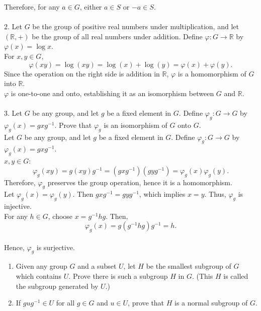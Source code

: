 Therefore, for any \( a \in G \), either \( a \in S \) or \( -a \in S \).
\\
\\
2. Let \( G \) be the group of positive real numbers under multiplication, and let \( (\mathbb{R}, +) \) be the group of all real numbers under addition. Define \( \varphi : G \to \mathbb{R} \) by \( \varphi(x) = \log x \).
\\
For \( x, y \in G \),
    \[
    \varphi(xy) = \log(xy) = \log(x) + \log(y) = \varphi(x) + \varphi(y).
    \]
    Since the operation on the right side is addition in \( \mathbb{R} \), \( \varphi \) is a homomorphism of \( G \) into \( \mathbb{R} \).
\\
\( \varphi \) is one-to-one and onto, establishing it as an isomorphism between \( G \) and \( \mathbb{R} \).
\\
\\
3. Let \( G \) be any group, and let \( g \) be a fixed element in \( G \). Define \( \varphi_g : G \to G \) by \( \varphi_g(x) = gxg^{-1} \). Prove that \( \varphi_g \) is an isomorphism of \( G \) onto \( G \).
\\
Let \( G \) be any group, and let \( g \) be a fixed element in \( G \). Define \( \varphi_g : G \to G \) by \( \varphi_g(x) = gxg^{-1} \).
\\
\( x, y \in G \):
    \[
    \varphi_g(xy) = g(xy)g^{-1} = (gxg^{-1})(gyg^{-1}) = \varphi_g(x) \varphi_g(y).
    \]
    Therefore, \( \varphi_g \) preserves the group operation, hence it is a homomorphism.
    \\
    Let \( \varphi_g(x) = \varphi_g(y) \). Then \( gxg^{-1} = gyg^{-1} \), which implies \( x = y \). Thus, \( \varphi_g \) is injective.
    \\
    For any \( h \in G \), choose \( x = g^{-1}hg \). Then,
    \[
    \varphi_g(x) = g(g^{-1}hg)g^{-1} = h.
    \]\\
    Hence, \( \varphi_g \) is surjective.
\\
\begin{enumerate}
    \item[3. (a)] Given any group \( G \) and a subset \( U \), let \( H \) be the smallest subgroup of \( G \) which contains \( U \). Prove there is such a subgroup \( H \) in \( G \). (This \( H \) is called the subgroup generated by \( U \).)
    \item[(b)] If \( gug^{-1} \in U \) for all \( g \in G \) and \( u \in U \), prove that \( H \) is a normal subgroup of \( G \).
\end{enumerate} 
